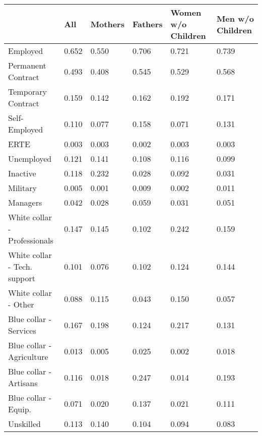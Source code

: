 \begin{tabular}{llllll}
\toprule
{} &      All &  Mothers &  Fathers & Women w/o Children & Men w/o Children \\
\midrule
Employed                     &    0.652 &    0.550 &    0.706 &              0.721 &            0.739 \\
Permanent Contract           &    0.493 &    0.408 &    0.545 &              0.529 &            0.568 \\
Temporary Contract           &    0.159 &    0.142 &    0.162 &              0.192 &            0.171 \\
Self-Employed                &    0.110 &    0.077 &    0.158 &              0.071 &            0.131 \\
ERTE                         &    0.003 &    0.003 &    0.002 &              0.003 &            0.003 \\
Unemployed                   &    0.121 &    0.141 &    0.108 &              0.116 &            0.099 \\
Inactive                     &    0.118 &    0.232 &    0.028 &              0.092 &            0.031 \\
Military                     &    0.005 &    0.001 &    0.009 &              0.002 &            0.011 \\
Managers                     &    0.042 &    0.028 &    0.059 &              0.031 &            0.051 \\
White collar - Professionals &    0.147 &    0.145 &    0.102 &              0.242 &            0.159 \\
White collar - Tech. support &    0.101 &    0.076 &    0.102 &              0.124 &            0.144 \\
White collar - Other         &    0.088 &    0.115 &    0.043 &              0.150 &            0.057 \\
Blue collar - Services       &    0.167 &    0.198 &    0.124 &              0.217 &            0.131 \\
Blue collar - Agriculture    &    0.013 &    0.005 &    0.025 &              0.002 &            0.018 \\
Blue collar - Artisans       &    0.116 &    0.018 &    0.247 &              0.014 &            0.193 \\
Blue collar - Equip.         &    0.071 &    0.020 &    0.137 &              0.021 &            0.111 \\
Unskilled                    &    0.113 &    0.140 &    0.104 &              0.094 &            0.083 \\

\end{tabular}
